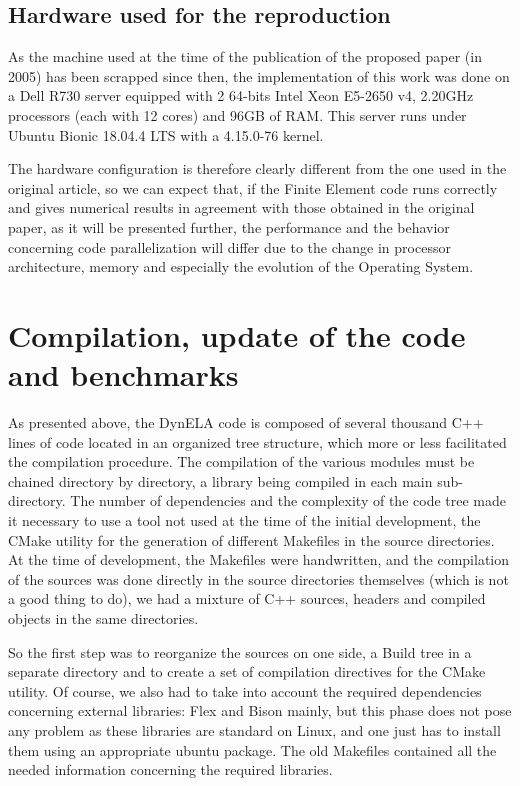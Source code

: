 \subsection{Hardware used for the reproduction}

As the machine used at the time of the publication of the proposed paper (in 2005) has been scrapped since then, the implementation of this work was done on a Dell R730 server equipped with 2 64-bits Intel Xeon E5-2650 v4, 2.20GHz processors (each with 12 cores) and 96GB of RAM. This server runs under Ubuntu Bionic 18.04.4 LTS with a 4.15.0-76 kernel. 

The hardware configuration is therefore clearly different from the one used in the original article, so we can expect that, if the Finite Element code runs correctly and gives numerical results in agreement with those obtained in the original paper, as it will be presented further, the performance and the behavior concerning code parallelization will differ due to the change in processor architecture, memory and especially the evolution of the Operating System.

\section{Compilation, update of the code and benchmarks}

As presented above, the DynELA code is composed of several thousand C++ lines of code located in an organized tree structure, which more or less facilitated the compilation procedure. The compilation of the various modules must be chained directory by directory, a library being compiled in each main sub-directory. The number of dependencies and the complexity of the code tree made it necessary to use a tool not used at the time of the initial development, the CMake \cite{CMake} utility for the generation of different Makefiles in the source directories. At the time of development, the Makefiles were handwritten, and the compilation of the sources was done directly in the source directories themselves (which is not a good thing to do), we had a mixture of C++ sources, headers and compiled objects in the same directories.

So the first step was to reorganize the sources on one side, a Build tree in a separate directory and to create a set of compilation directives for the CMake utility. Of course, we also had to take into account the required dependencies concerning external libraries: Flex and Bison \cite{Levine:2009} mainly, but this phase does not pose any problem as these libraries are standard on Linux, and one just has to install them using an appropriate ubuntu package. The old Makefiles contained all the needed information concerning the required libraries.

